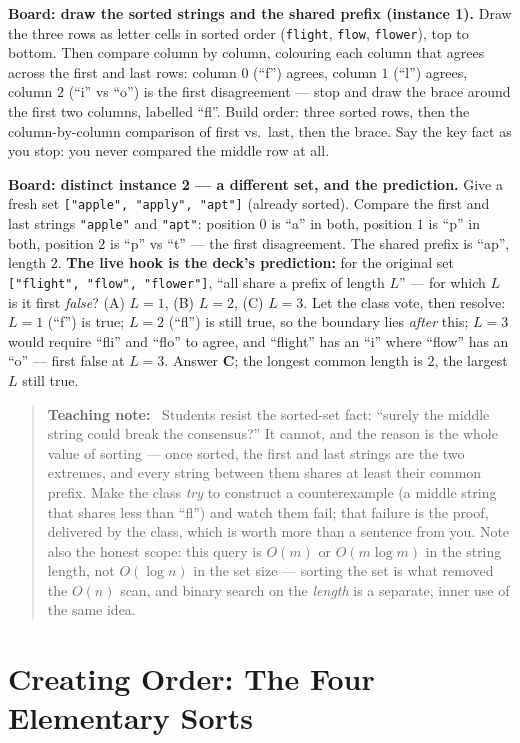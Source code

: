 \documentclass[11pt]{article}
\newenvironment{teachingaside}{\begin{quote}\small\color{primary-gold}\textbf{Teaching note:}\ }{\end{quote}}
\begin{document}
\textbf{Board: draw the sorted strings and the shared prefix (instance 1).} Draw the three rows as letter cells in sorted order (\texttt{flight}, \texttt{flow}, \texttt{flower}), top to bottom. Then compare column by column, colouring each column that agrees across the first and last rows: column $0$ (``f'') agrees, column $1$ (``l'') agrees, column $2$ (``i'' vs ``o'') is the first disagreement --- stop and draw the brace around the first two columns, labelled ``fl''. Build order: three sorted rows, then the column-by-column comparison of first vs.\ last, then the brace. Say the key fact as you stop: you never compared the middle row at all.

\textbf{Board: distinct instance 2 --- a different set, and the prediction.} Give a fresh set \texttt{["apple", "apply", "apt"]} (already sorted). Compare the first and last strings \texttt{"apple"} and \texttt{"apt"}: position $0$ is ``a'' in both, position $1$ is ``p'' in both, position $2$ is ``p'' vs ``t'' --- the first disagreement. The shared prefix is ``ap'', length $2$. \textbf{The live hook is the deck's prediction:} for the original set \texttt{["flight", "flow", "flower"]}, ``all share a prefix of length $L$'' --- for which $L$ is it first \emph{false}? (A) $L=1$, (B) $L=2$, (C) $L=3$. Let the class vote, then resolve: $L=1$ (``f'') is true; $L=2$ (``fl'') is still true, so the boundary lies \emph{after} this; $L=3$ would require ``fli'' and ``flo'' to agree, and ``flight'' has an ``i'' where ``flow'' has an ``o'' --- first false at $L=3$. Answer \textbf{C}; the longest common length is $2$, the largest $L$ still true.

\begin{teachingaside}
Students resist the sorted-set fact: ``surely the middle string could break the consensus?'' It cannot, and the reason is the whole value of sorting --- once sorted, the first and last strings are the two extremes, and every string between them shares at least their common prefix. Make the class \emph{try} to construct a counterexample (a middle string that shares less than ``fl'') and watch them fail; that failure is the proof, delivered by the class, which is worth more than a sentence from you. Note also the honest scope: this query is $O(m)$ or $O(m \log m)$ in the string length, not $O(\log n)$ in the set size --- sorting the set is what removed the $O(n)$ scan, and binary search on the \emph{length} is a separate, inner use of the same idea.
\end{teachingaside}

\section{Creating Order: The Four Elementary Sorts}
\label{sec:sorts}
\end{document}

